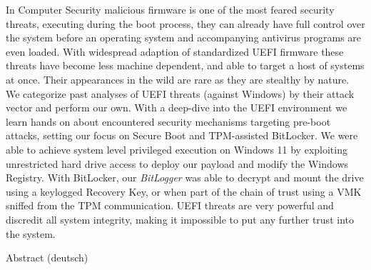 

\label{sec:abstract}

In Computer Security malicious firmware is one of the most feared security threats, executing during the boot process, they can already have full control over the system before an operating system and accompanying antivirus programs are even loaded.
With widespread adaption of standardized \acs{UEFI} firmware these threats have become less machine dependent, and able to target a host of systems at once.
Their appearances in the wild are rare as they are stealthy by nature. We categorize past analyses of UEFI threats (against Windows) by their attack vector and perform our own.
With a deep-dive into the UEFI environment we learn hands on about encountered security mechanisms targeting pre-boot attacks, setting our focus on Secure Boot and TPM-assisted BitLocker.
We were able to achieve system level privileged execution on Windows 11 by exploiting unrestricted hard drive access to deploy our payload and modify the Windows Registry. With BitLocker, our \emph{BitLogger} was able to decrypt and mount the drive using a keylogged Recovery Key, or when part of the chain of trust using a VMK sniffed from the TPM communication.
UEFI threats are very powerful and discredit all system integrity, making it impossible to put any further trust into the system.

\vspace*{20mm}

{Abstract (deutsch)}
\label{sec:abstract-diff}

\blindtext
